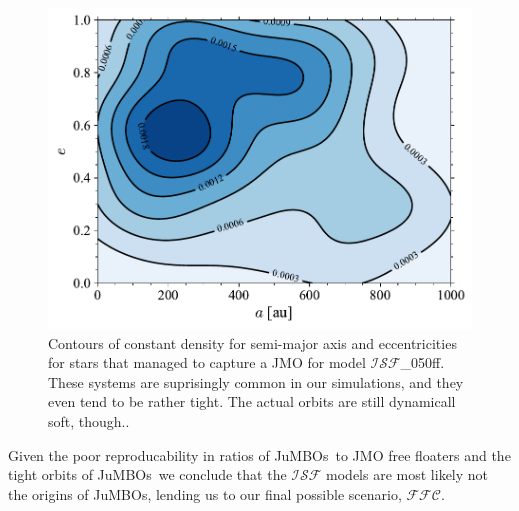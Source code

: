\documentclass[submission,phys]{lib/SciPost}
\newcommand{\jumbos}{\mbox{JuMBOs}}
\begin{document}
   \begin{figure}
    \centering
    \includegraphics[width=0.75\columnwidth]{figures/Fractal_rvir0.5_FF_Obs_sem_ecc_mixed_systs.pdf}
    \caption{Contours of constant density for semi-major axis and
      eccentricities for stars that managed to capture a JMO for model
      $\mathcal{ISF}$\_050ff. These systems are suprisingly common in
      our simulations, and they even tend to be rather tight. The
      actual orbits are still dynamicall soft, though.. }
         \label{Fig:MixedSys_OrbParams}
   \end{figure}

    Given the poor reproducability in ratios of \jumbos\, to JMO free floaters and the tight orbits of \jumbos\, we conclude that the $\mathcal{ISF}$ models are most likely not the origins of \jumbos, lending us to our final possible scenario, $\mathcal{FFC}$.

   
\end{document}
